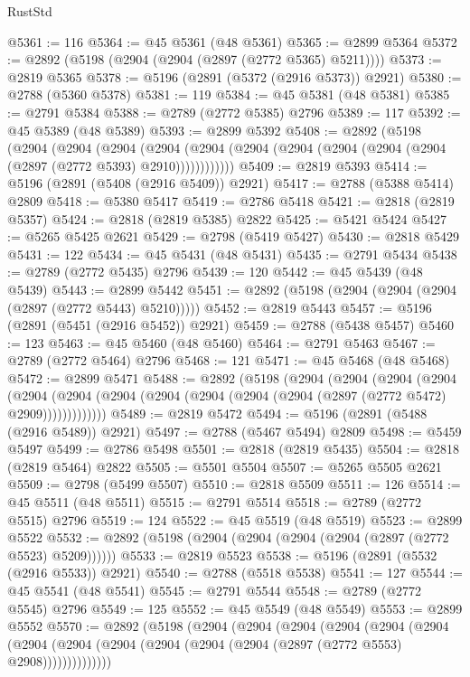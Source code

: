 \begin{lexlean}{RustStd}
\begin{coremodule}
@5361 := 116
@5364 := @45 @5361 (@48 @5361)
@5365 := @2899 @5364
@5372 := @2892 (@5198 (@2904 (@2904 (@2897 (@2772 @5365) @5211))))
@5373 := @2819 @5365
@5378 := @5196 (@2891 (@5372 (@2916 @5373)) @2921)
@5380 := @2788 (@5360 @5378)
@5381 := 119
@5384 := @45 @5381 (@48 @5381)
@5385 := @2791 @5384
@5388 := @2789 (@2772 @5385) @2796
@5389 := 117
@5392 := @45 @5389 (@48 @5389)
@5393 := @2899 @5392
@5408 := @2892
    (@5198
      (@2904
        (@2904
          (@2904
            (@2904 (@2904 (@2904 (@2904 (@2904 (@2904 (@2904 (@2897 (@2772 @5393) @2910))))))))))))
@5409 := @2819 @5393
@5414 := @5196 (@2891 (@5408 (@2916 @5409)) @2921)
@5417 := @2788 (@5388 @5414) @2809
@5418 := @5380 @5417
@5419 := @2786 @5418
@5421 := @2818 (@2819 @5357)
@5424 := @2818 (@2819 @5385) @2822
@5425 := @5421 @5424
@5427 := @5265 @5425 @2621
@5429 := @2798 (@5419 @5427)
@5430 := @2818 @5429
@5431 := 122
@5434 := @45 @5431 (@48 @5431)
@5435 := @2791 @5434
@5438 := @2789 (@2772 @5435) @2796
@5439 := 120
@5442 := @45 @5439 (@48 @5439)
@5443 := @2899 @5442
@5451 := @2892 (@5198 (@2904 (@2904 (@2904 (@2897 (@2772 @5443) @5210)))))
@5452 := @2819 @5443
@5457 := @5196 (@2891 (@5451 (@2916 @5452)) @2921)
@5459 := @2788 (@5438 @5457)
@5460 := 123
@5463 := @45 @5460 (@48 @5460)
@5464 := @2791 @5463
@5467 := @2789 (@2772 @5464) @2796
@5468 := 121
@5471 := @45 @5468 (@48 @5468)
@5472 := @2899 @5471
@5488 := @2892
    (@5198
      (@2904
        (@2904
          (@2904
            (@2904
              (@2904
                (@2904 (@2904 (@2904 (@2904 (@2904 (@2904 (@2897 (@2772 @5472) @2909)))))))))))))
@5489 := @2819 @5472
@5494 := @5196 (@2891 (@5488 (@2916 @5489)) @2921)
@5497 := @2788 (@5467 @5494) @2809
@5498 := @5459 @5497
@5499 := @2786 @5498
@5501 := @2818 (@2819 @5435)
@5504 := @2818 (@2819 @5464) @2822
@5505 := @5501 @5504
@5507 := @5265 @5505 @2621
@5509 := @2798 (@5499 @5507)
@5510 := @2818 @5509
@5511 := 126
@5514 := @45 @5511 (@48 @5511)
@5515 := @2791 @5514
@5518 := @2789 (@2772 @5515) @2796
@5519 := 124
@5522 := @45 @5519 (@48 @5519)
@5523 := @2899 @5522
@5532 := @2892 (@5198 (@2904 (@2904 (@2904 (@2904 (@2897 (@2772 @5523) @5209))))))
@5533 := @2819 @5523
@5538 := @5196 (@2891 (@5532 (@2916 @5533)) @2921)
@5540 := @2788 (@5518 @5538)
@5541 := 127
@5544 := @45 @5541 (@48 @5541)
@5545 := @2791 @5544
@5548 := @2789 (@2772 @5545) @2796
@5549 := 125
@5552 := @45 @5549 (@48 @5549)
@5553 := @2899 @5552
@5570 := @2892
    (@5198
      (@2904
        (@2904
          (@2904
            (@2904
              (@2904
                (@2904
                  (@2904 (@2904 (@2904 (@2904 (@2904 (@2904 (@2897 (@2772 @5553) @2908))))))))))))))

\end{coremodule}
\end{lexlean}
